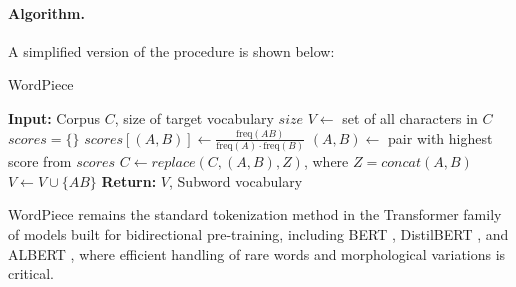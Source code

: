     \paragraph{Algorithm.}  
    A simplified version of the procedure is shown below:
    
    \begin{algorithm}
    \caption{WordPiece}
    \begin{algorithmic}[1]
    \State \textbf{Input:} Corpus $C$, size of target vocabulary $size$
    \State $V \gets$ set of all characters in $C$
        \State $scores = \{\}$
            \State $scores[(A,B)] \gets \frac{\text{freq}(AB)}{\text{freq}(A)\cdot \text{freq}(B)}$ 
        \EndFor
        \State $(A,B) \gets$ pair with highest score from $scores$
        \State $C \gets replace(C, (A,B), Z)$, where $Z = concat(A, B)$
        \State $V \gets V \cup \{AB\}$
    \EndWhile
    \State \textbf{Return:} $V$, Subword vocabulary
    \end{algorithmic}
    \end{algorithm}

    WordPiece remains the standard tokenization method in the Transformer family of models built for bidirectional pre-training, including BERT \cite{devlin2019bert}, DistilBERT \cite{sanh2019distilbert}, and ALBERT \cite{lan2019albert}, where efficient handling of rare words and morphological variations is critical.



